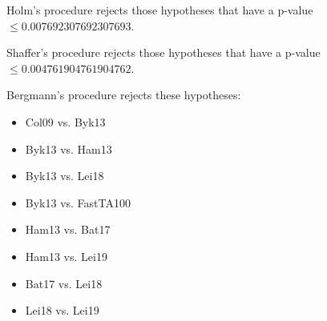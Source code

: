 \documentclass[a4paper,10pt]{article}
\begin{document}
\begin{landscape}
Holm's procedure rejects those hypotheses that have a p-value $\le0.007692307692307693$.


Shaffer's procedure rejects those hypotheses that have a p-value $\le0.004761904761904762$.


Bergmann's procedure rejects these hypotheses:


\begin{itemize}


\item Col09 vs. Byk13
\item Byk13 vs. Ham13
\item Byk13 vs. Lei18
\item Byk13 vs. FastTA100
\item Ham13 vs. Bat17
\item Ham13 vs. Lei19
\item Bat17 vs. Lei18
\item Lei18 vs. Lei19
\end{itemize}



\end{landscape}
\end{document}
